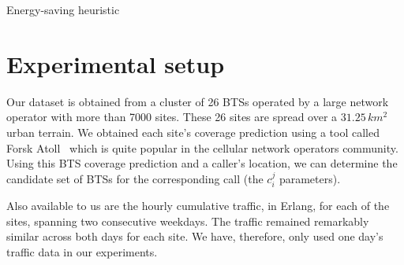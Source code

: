 \IncMargin{1em}
\LinesNumbered
\begin{algorithm}
\caption{Energy-saving heuristic}
\label{algo:heur2}
\end{algorithm}
\DecMargin{1em}

\section{Experimental setup}
Our dataset is obtained from a cluster of 26 BTSs operated by a large network operator with more than 7000 sites. These 26 sites are spread over a $31.25$\,$km^2$ urban terrain. We obtained each site's coverage prediction using a tool called Forsk Atoll~\cite{atoll} which is quite popular in the cellular network operators community. Using this BTS coverage prediction and a caller's location, we can determine the candidate set of BTSs for the corresponding call (the $c_i^j$ parameters). 

Also available to us are the hourly cumulative traffic, in Erlang, for each of the sites, spanning two consecutive weekdays. The traffic remained remarkably similar across both days for each site. We have, therefore, only used one day's traffic data in our experiments.

